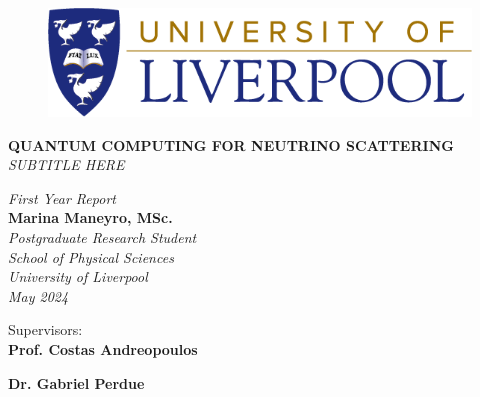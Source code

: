 
\changefontsizes{13pt}

\begin{titlepage}

\clearpage
{}
\begin{figure}[ht]
	\centering
    \includegraphics[scale=0.33]{UoL - Logo - CMYK.png}
\end{figure}
\vspace{2mm}

\begin{center}

    \LARGE{\textbf{\uppercase{Quantum Computing for Neutrino Scattering}}} \\    \vspace{2mm}
    \large{\textit{\uppercase{Subtitle here}}}
    
	\vspace{10mm}
	\large {\textit{First Year Report}}\\
	\Large{\textbf{Marina Maneyro, MSc.}}\\
	\vspace{5mm}
	\textit{\normalsize Postgraduate Research Student\\ School of Physical Sciences \\
    \normalsize{University of Liverpool}\\May 2024}
\end{center}
\vspace{30mm}


\begin{center}
    \normalsize{Supervisors:}\vspace{3mm}
	\\ \large{\textbf{Prof. Costas Andreopoulos}}\\
	
 	\vspace{2mm}
 	
	\large{\textbf{Dr. Gabriel Perdue}}


\end{center}
\end{titlepage}
